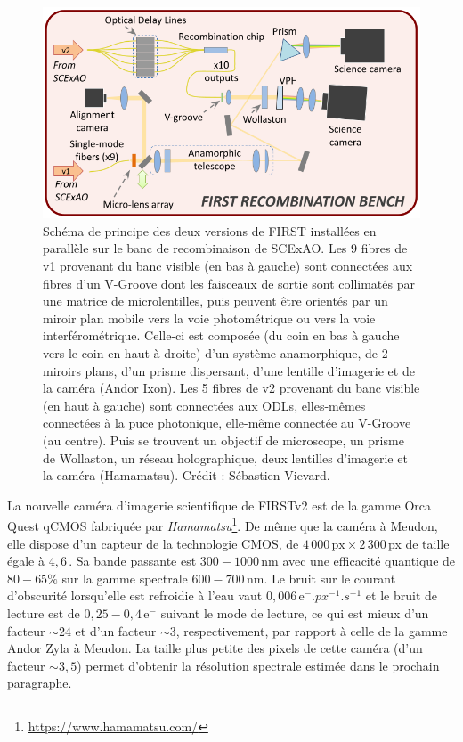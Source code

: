 \begin{figure}[ht!]
    \centering
    \includegraphics[width=\figwidth]{Figure_Chap5/20220601_SCExAO_FIRSTRecombBench_V1_V2_Scheme.png}
    \caption[Schéma de principe des deux versions de FIRST installées en parallèle sur le banc de recombinaison de SCExAO.]{Schéma de principe des deux versions de FIRST installées en parallèle sur le banc de recombinaison de SCExAO. Les $9$ fibres de v1 provenant du banc visible (en bas à gauche) sont connectées aux fibres d'un V-Groove dont les faisceaux de sortie sont collimatés par une matrice de microlentilles, puis peuvent être orientés par un miroir plan mobile vers la voie photométrique ou vers la voie interférométrique. Celle-ci est composée (du coin en bas à gauche vers le coin en haut à droite) d'un système anamorphique, de 2 miroirs plans, d'un prisme dispersant, d'une lentille d'imagerie et de la caméra (Andor Ixon). Les 5 fibres de v2 provenant du banc visible (en haut à gauche) sont connectées aux ODLs, elles-mêmes connectées à la puce photonique, elle-même connectée au V-Groove (au centre). Puis se trouvent un objectif de microscope, un prisme de Wollaston, un réseau holographique, deux lentilles d'imagerie et la caméra (Hamamatsu). Crédit : Sébastien Vievard.}
    \label{fig:FIRSTV1V2FinalScheme}
\end{figure}

La nouvelle caméra d'imagerie scientifique de \ac{FIRSTv2} est de la gamme Orca Quest qCMOS fabriquée par \textit{Hamamatsu}\footnote{\url{https://www.hamamatsu.com/}}. De même que la caméra à Meudon, elle dispose d'un capteur de la technologie \ac{CMOS}, de $4\,000 \,\text{px} \times 2\,300 \,$px de taille égale à $4,6 \,$\um. Sa bande passante est $300 - 1000 \,$nm avec une efficacité quantique de $80 - 65\%$ sur la gamme spectrale $600 - 700 \,$nm. Le bruit sur le courant d'obscurité lorsqu'elle est refroidie à l'eau vaut $0,006 \,\text{e}^-.px^{-1}.s^{-1}$ et le bruit de lecture est de $0,25 - 0,4 \,\text{e}^-$ suivant le mode de lecture, ce qui est mieux d'un facteur $\sim 24$ et d'un facteur $\sim 3$, respectivement, par rapport à celle de la gamme Andor Zyla à Meudon. La taille plus petite des pixels de cette caméra (d'un facteur $\sim 3,5$) permet d'obtenir la résolution spectrale estimée dans le prochain paragraphe.

